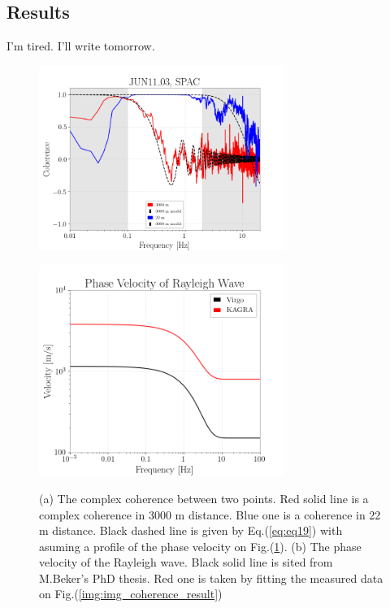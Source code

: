\documentclass[a4paper,12pt]{book}
\begin{document}
\subsection{Results}
I'm tired. I'll write tomorrow.
\begin{figure}[H] 
 \begin{minipage}{0.5\hsize}
  \begin{center}
    \includegraphics[width=8.0cm]{./img_coherence_result.png}    
  \end{center}
  \subcaption{}  
  \label{img:img_coherence_result}
 \end{minipage}
 \begin{minipage}{0.5\hsize}
  \begin{center}
    \includegraphics[width=8.0cm]{./img_RwaveVelocity.png}    
  \end{center}
  \subcaption{}
  \label{img:img_RwaveVelocity}  
 \end{minipage}
  \caption{(a) The complex coherence between two points. Red solid line is a complex coherence in 3000 m distance. Blue one is a coherence in 22 m distance. Black dashed line is given by Eq.(\ref{eq:eq19}) with asuming a profile of the phase velocity on Fig.(\ref{img:img_RwaveVelocity}). (b) The phase velocity of the Rayleigh wave. Black solid line is sited from M.Beker's PhD thesis. Red one is taken by fitting the measured data on Fig.(\ref{img:img_coherence_result})} 
\end{figure}
\end{document}
